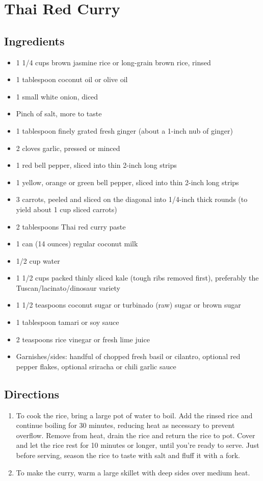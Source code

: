\documentclass[oneside,11pt]{book}
\newcommand{\Ingredients}[1]{
    \subsection*{Ingredients}
    \begin{itemize} 
        #1 
    \end{itemize}
}
\newcommand{\Directions}[1]{
    \subsection*{Directions}
    \begin{enumerate} 
        #1 
    \end{enumerate}
}
\newcommand{\recipe}[3]{
	\pagebreak
    \section*{ \hspace{-12pt} #1 }
    \addcontentsline{toc}{section}{ \hspace{-6pt} #1 }
	
	\begin{minipage}[t]{0.35\textwidth}
	    #2
	\end{minipage}
	\hspace{0.05\textwidth}
	\begin{minipage}[t]{0.6\textwidth}
	    #3
	\end{minipage}
}
\begin{document}
    \recipe{Thai Red Curry}{
        \Ingredients{
            \item 1 1/4 cups brown jasmine rice or long-grain brown rice, rinsed
            \item 1 tablespoon coconut oil or olive oil
            \item 1 small white onion, diced
            \item Pinch of salt, more to taste
            \item 1 tablespoon finely grated fresh ginger (about a 1-inch nub of ginger)
            \item 2 cloves garlic, pressed or minced
            \item 1 red bell pepper, sliced into thin 2-inch long strips
            \item 1 yellow, orange or green bell pepper, sliced into thin 2-inch long strips
            \item 3 carrots, peeled and sliced on the diagonal into 1/4-inch thick rounds (to yield about 1 cup sliced carrots)
            \item 2 tablespoons Thai red curry paste
            \item 1 can (14 ounces) regular coconut milk
            \item 1/2 cup water
            \item 1 1/2 cups packed thinly sliced kale (tough ribs removed first), preferably the Tuscan/lacinato/dinosaur variety
            \item 1 1/2 teaspoons coconut sugar or turbinado (raw) sugar or brown sugar
            \item 1 tablespoon tamari or soy sauce
            \item 2 teaspoons rice vinegar or fresh lime juice
            \item Garnishes/sides: handful of chopped fresh basil or cilantro, optional red pepper flakes, optional sriracha or chili garlic sauce
        }
	}{
        \Directions{
            \item To cook the rice, bring a large pot of water to boil. 
                Add the rinsed rice and continue boiling for 30 minutes, reducing heat as necessary to prevent overflow. 
                Remove from heat, drain the rice and return the rice to pot. 
                Cover and let the rice rest for 10 minutes or longer, until you're ready to serve. 
                Just before serving, season the rice to taste with salt and fluff it with a fork.
            \item To make the curry, warm a large skillet with deep sides over medium heat. 
}}
\end{document}
